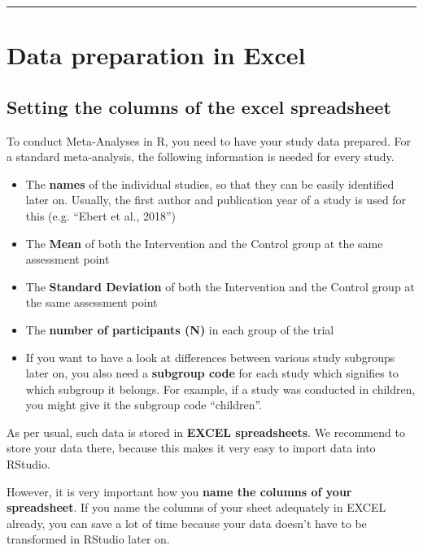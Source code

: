 \documentclass[]{book}
\providecommand{\tightlist}{%
  \setlength{\itemsep}{0pt}\setlength{\parskip}{0pt}}
\begin{document}
\begin{center}\rule{0.5\linewidth}{\linethickness}\end{center}

\hypertarget{data-preparation-in-excel}{%
\section{Data preparation in Excel}\label{data-preparation-in-excel}}

\hypertarget{excel_preparation}{%
\subsection{Setting the columns of the excel spreadsheet}\label{excel_preparation}}

To conduct Meta-Analyses in R, you need to have your study data prepared. For a standard meta-analysis, the following information is needed for every study.

\begin{itemize}
\tightlist
\item
  The \textbf{names} of the individual studies, so that they can be easily identified later on. Usually, the first author and publication year of a study is used for this (e.g. ``Ebert et al., 2018'')
\item
  The \textbf{Mean} of both the Intervention and the Control group at the same assessment point
\item
  The \textbf{Standard Deviation} of both the Intervention and the Control group at the same assessment point
\item
  The \textbf{number of participants (N)} in each group of the trial
\item
  If you want to have a look at differences between various study subgroups later on, you also need a \textbf{subgroup code} for each study which signifies to which subgroup it belongs. For example, if a study was conducted in children, you might give it the subgroup code ``children''.
\end{itemize}

As per usual, such data is stored in \textbf{EXCEL spreadsheets}. We recommend to store your data there, because this makes it very easy to import data into RStudio.

However, it is very important how you \textbf{name the columns of your spreadsheet}. If you name the columns of your sheet adequately in EXCEL already, you can save a lot of time because your data doesn't have to be transformed in RStudio later on.
\end{document}
